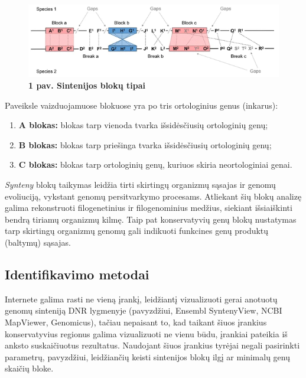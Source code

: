 \documentclass[12pt]{article}
\begin{document}
\begin{figure}[htb]
    \begin{center}
        \includegraphics[width=0.7\linewidth]{../Figures/Synteny_block_definition.png}
        \vspace{-2\baselineskip}
        \caption*{\small\textbf{1 pav. Sintenijos blokų tipai}}
        \label{fig:birds}
    \end{center}
\end{figure}

Paveiksle vaizduojamuose blokuose yra po tris ortologinius genus (inkarus):
\begin{enumerate}
    \item \textbf{A blokas:} blokas tarp vienoda tvarka išsidėsčiusių
    ortologinių genų;
    \item \textbf{B blokas:} blokas tarp priešinga tvarka išsidėsčiusių
    ortologinių genų;
    \item \textbf{C blokas:} blokas tarp ortologinių genų, kuriuos skiria
    neortologiniai genai.
\end{enumerate}

\emph{Synteny} blokų taikymas leidžia tirti skirtingų organizmų sąsajas ir
genomų evoliuciją, vykstant genomų persitvarkymo procesams. Atliekant šių
blokų analizę galima rekonstruoti filogenetinius ir filogenominius
medžius\cite{PHYLO_REF}, siekiant išsiaiškinti bendrą tiriamų organizmų kilmę.
Taip pat konservatyvių genų blokų nustatymas tarp skirtingų organizmų genomų
gali indikuoti funkcines genų produktų (baltymų) sąsajas\cite{FUNC_REF}.

\newpage

\subsection{Identifikavimo metodai}
Internete galima rasti ne vieną įrankį, leidžiantį vizualizuoti gerai anotuotų
genomų sinteniją DNR lygmenyje (pavyzdžiui, Ensembl SyntenyView\cite{ENS_SYN},
NCBI MapViewer\cite{NCBI_MAP}, Genomicus\cite{GENOMICUS}), tačiau nepaisant to,
kad taikant šiuos įrankius konservatyvius regionus galima vizualizuoti ne vienu
būdu, įrankiai pateikia iš anksto suskaičiuotus rezultatus. Naudojant šiuos
įrankius tyrėjai negali pasirinkti parametrų, pavyzdžiui, leidžiančių keisti
sintenijos blokų ilgį ar minimalų genų skaičių bloke.
\end{document}
